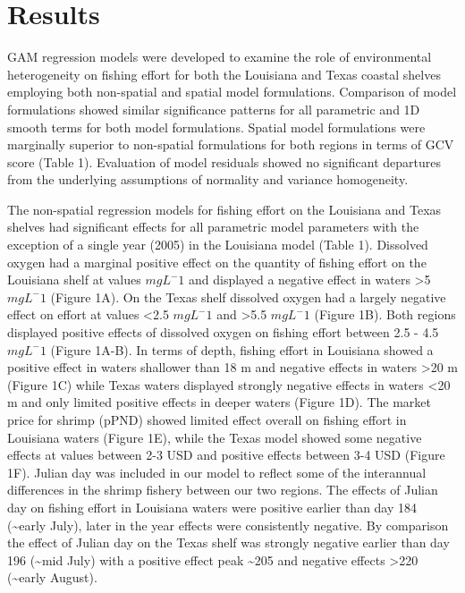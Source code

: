 \documentclass[10pt]{article}
\begin{document}
\section*{Results}
GAM regression models were developed to examine the role of environmental heterogeneity on fishing effort for both the Louisiana and Texas coastal shelves employing both non-spatial and spatial model formulations.  Comparison of model formulations showed similar significance patterns for all parametric and 1D smooth terms for both model formulations.  Spatial model formulations were marginally superior to non-spatial formulations for both regions in terms of GCV score (Table 1).  Evaluation of model residuals showed no significant departures from the underlying assumptions of normality and variance homogeneity.

The non-spatial regression models for fishing effort on the Louisiana and Texas shelves had significant effects for all parametric model parameters with the exception of a single year (2005) in the Louisiana model (Table 1).  Dissolved oxygen had a marginal positive effect on the quantity of fishing effort on the Louisiana shelf at values  $mg L^-1$ and displayed a negative effect in waters \textgreater  5 $mg L^-1$ (Figure 1A).  On the Texas shelf dissolved oxygen had a largely negative effect on effort at values \textless  2.5 $ mg L^-1 $ and \textgreater  5.5 $mg L^-1$ (Figure 1B).  Both regions displayed positive effects of dissolved oxygen on fishing effort between 2.5 - 4.5 $mg L^-1$ (Figure 1A-B).  In terms of depth, fishing effort in Louisiana showed a positive effect in waters shallower than 18 m and negative effects in waters \textgreater 20 m (Figure 1C) while Texas waters displayed strongly negative effects in waters \textless 20 m and only limited positive effects in deeper waters (Figure 1D).  The market price for shrimp (pPND) showed limited effect overall on fishing effort in Louisiana waters (Figure 1E), while the Texas model showed some negative effects at values between 2-3 USD and positive effects between 3-4 USD (Figure 1F).  Julian day was included in our model to reflect some of the interannual differences in the shrimp fishery between our two regions.  The effects of Julian day on fishing effort in Louisiana waters were positive earlier than day 184 (\sim early July), later in the year effects were consistently negative.  By comparison the effect of Julian day on the Texas shelf was strongly negative earlier than day 196 (\sim mid July) with a positive effect peak \sim 205 and negative effects \textgreater 220 (\sim early August).  
 
\end{document}
